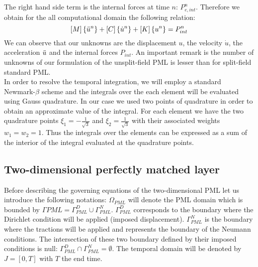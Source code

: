 The right hand side term is the internal forces at time $n$: $P_{e,int}^n$. Therefore we obtain for the all computational domain the following relation:
\begin{equation}
    \left[M\right]\left\{\Ddot{u}^n\right\} + \left[C\right] \left\{\Dot{u}^n\right\}+ \left[K\right] \left\{u^n\right\} = P_{int}^n
\end{equation}
We can observe that our unknowns are the displacement $u$, the velocity $\Dot{u}$, the acceleration $\Ddot{u}$ and the internal forces $P_{int}$. An important remark is the number of unknowns of our formulation of the unsplit-field PML is lesser than for split-field standard PML.\\ 
In order to resolve the temporal integration, we will employ a standard Newmark-$\beta$ scheme and the integrals over the each element will be evaluated using Gauss quadrature. In our case we used two points of quadrature in order to obtain an approximate value of the integral. For each element we have the two quadrature points $\xi_1 =- \frac{1}{\sqrt{3}}$  and $\xi_2 = \frac{1}{\sqrt{3}}$ with their associated weights $w_1=w_2=1$. Thus the integrals over the elements can be expressed as a sum of the interior of the integral evaluated at the quadrature points. \\


\subsection{Two-dimensional perfectly matched layer}
Before describing the governing equations of the two-dimensional PML let us introduce the following notations: $\Omega_{PML}$ will denote the PML domain which is bounded by $\Gamma{PML} = \Gamma_{PML}^D \cup \Gamma_{PML}^N$. $\Gamma_{PML}^D$ corresponds to the boundary where the Dirichlet condition will be applied (imposed displacement). $\Gamma_{PML}^N$ is the boundary where the tractions will be applied and represents the boundary of the Neumann conditions. The intersection of these two boundary defined by their imposed conditions is null: $\Gamma_{PML}^D \cap \Gamma_{PML}^N = \emptyset$. The temporal domain will be denoted by $J = [0,T]$ with $T$ the end time.
